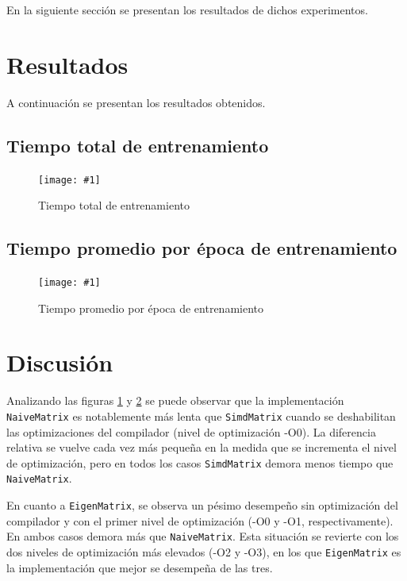 \documentclass[a4paper, 10pt, twoside]{article}
\newcommand{\grafico}[3]{
  \begin{figure}[H]
    \texttt{[image: \#1]}
    \caption{#2}
    \label{#3}
  \end{figure}
}
\newcommand{\cc}[1]{\texttt{#1}}
\begin{document}
En la siguiente sección se presentan los resultados de dichos experimentos.




\section{Resultados}

A continuación se presentan los resultados obtenidos.


\subsection{Tiempo total de entrenamiento}

\grafico{total-training-time}
        {Tiempo total de entrenamiento}
        {img:total-training-time}


\subsection{Tiempo promedio por época de entrenamiento}

\grafico{avg-epoch-time}
        {Tiempo promedio por época de entrenamiento}
        {img:avg-epoch-time}




\section{Discusión}

Analizando las figuras \ref{img:total-training-time} y \ref{img:avg-epoch-time}
se puede observar que la implementación \cc{NaiveMatrix} es notablemente más
lenta que \cc{SimdMatrix} cuando se deshabilitan las optimizaciones del
compilador (nivel de optimización -O0). La diferencia relativa se vuelve cada
vez más pequeña en la medida que se incrementa el nivel de optimización, pero
en todos los casos \cc{SimdMatrix} demora menos tiempo que \cc{NaiveMatrix}.

En cuanto a \cc{EigenMatrix}, se observa un pésimo desempeño sin optimización
del compilador y con el primer nivel de optimización (-O0 y -O1,
respectivamente). En ambos casos demora más que \cc{NaiveMatrix}. Esta
situación se revierte con los dos niveles de optimización más elevados (-O2 y
-O3), en los que \cc{EigenMatrix} es la implementación que mejor se desempeña
de las tres.
\end{document}
